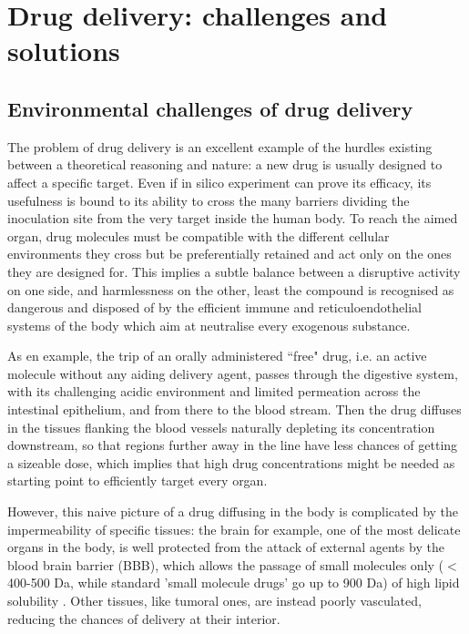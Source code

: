 \documentclass[a4paper,11pt]{extreport}
\begin{document}
\clearpage


\section{Drug delivery: challenges and solutions}

\subsection{Environmental challenges of drug delivery}
The problem of drug delivery is an excellent example of the hurdles existing between a theoretical reasoning and nature: a new drug is usually designed to affect a specific target. Even if in silico experiment can prove its efficacy, its usefulness is bound to its ability to cross the many barriers dividing the inoculation site from the very target inside the human body.
%
To reach the aimed organ, drug molecules must be compatible with the different cellular environments they cross but be preferentially retained and act only on the ones they are designed for. This implies a subtle balance between a disruptive activity on one side, and harmlessness on the other, least the compound is recognised as dangerous and disposed of by the efficient immune and reticuloendothelial systems of the body which aim at neutralise every exogenous substance.

As en example, the trip of an orally  administered ``free" drug, i.e. an active molecule without any aiding delivery agent, passes through the digestive system, with its challenging acidic environment and limited permeation across the intestinal epithelium, and from there to the blood stream.\cite{Masaoka2006, Mitragotri2014} Then the drug diffuses in the tissues flanking the blood vessels naturally depleting its concentration downstream,\cite{Krol2012}  so that regions further away in the line have less chances of getting a sizeable dose, which implies that high drug concentrations might be needed as starting point to efficiently target every organ.

However, this naive picture of a drug diffusing in the body is complicated by the impermeability of specific tissues: the brain for example, one of the most delicate organs in the body, is well protected from the attack of external agents by the blood brain barrier (BBB), which allows the passage of small molecules only ($<$ 400-500 Da, while standard 'small molecule drugs' go up to 900 Da) of high lipid solubility \cite{Pattni2015, Krol2012}. Other tissues, like tumoral ones, are instead poorly vasculated, reducing the chances of delivery at their interior.\cite{Pattni2015}
\end{document}
